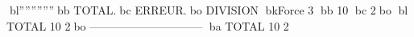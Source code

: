 bl''''''''''''bb           TOTAL.bc      ERREUR.bo
DIVISION
bkForce      3     bb 10	bc        2bo
bl TOTAL            10	        2bo
------------------------------
ba TOTAL            10	        2
